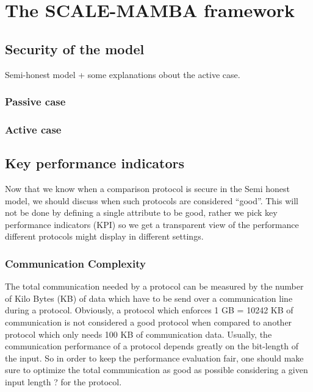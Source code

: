 \section{The SCALE-MAMBA framework}

\subsection{Security of the model}
Semi-honest model + some explanations obout the active case.


\subsubsection{Passive case}



\subsubsection{Active case}


\subsection{Key performance indicators}
Now that we know when a comparison protocol is secure in the Semi honest model, we should discuss when such protocols are considered “good”. This will not be done by defining a single attribute to be good, rather we pick key performance indicators (KPI) so we get a transparent view of the performance different protocols might display in different settings.

\subsubsection{Communication Complexity}
The total communication needed by a protocol can be measured by the number of Kilo Bytes (KB) of data which have to be send over a communication line during a protocol. Obviously, a protocol which enforces 1 GB = 10242 KB of communication is not considered a good protocol when compared to another protocol which only needs 100 KB of communication data. Usually, the communication performance of a protocol depends greatly on the bit-length of the input. So in order to keep the performance evaluation fair, one should make sure to optimize the total communication as good as possible considering a given input length ? for the protocol.

